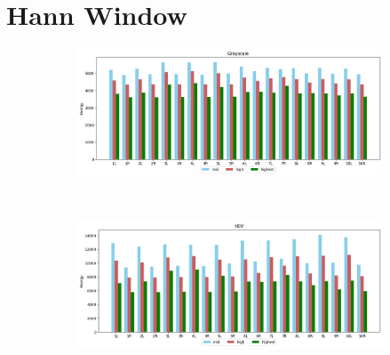\section{Hann Window}

\begin{figure}[!ht]
    \caption{Coin "o" STFT approach with Hann window for Grayscale (a) and HSV (b) colourspaces.}
    \centering
    \begin{subfigure}{\textwidth}
        \centering
        \includegraphics[scale=0.4]{images/appendix/stft/coin_o/hann_Grayscale.png}
        \caption{}
    \end{subfigure}\\
    \begin{subfigure}{\textwidth}
         \centering
          \includegraphics[scale=0.4]{images/appendix/stft/coin_o/hann_HSV.png}
          \caption{}
    \end{subfigure}
    \fautor
\end{figure}

